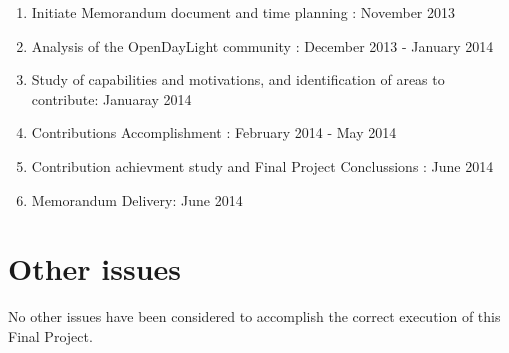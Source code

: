 \documentclass[10pt]{article}
\begin{document}
\begin{enumerate}
  \item Initiate Memorandum document and time planning : November 2013
  \item Analysis of the OpenDayLight community : December 2013 - January 2014
  \item Study of capabilities and motivations, and identification of areas to contribute: Januaray 2014
  \item Contributions Accomplishment : February 2014 - May 2014
  \item Contribution achievment study and Final Project Conclussions : June 2014
  \item Memorandum Delivery: June 2014
\end{enumerate}

\section{Other issues}

No other issues have been considered to accomplish the correct execution of this Final Project.
\end{document}
